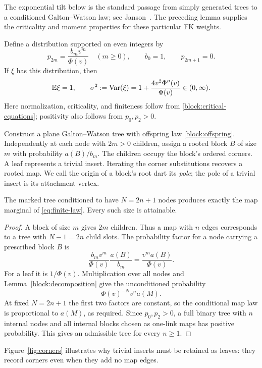 The exponential tilt below is the standard passage from simply
generated trees to a conditioned Galton--Watson law; see
Janson~\cite[Section~4]{Janson2012}. The preceding lemma supplies the
criticality and moment properties for these particular FK weights.

Define a distribution supported on even integers by
\begin{equation}\label{block:offspring}
 p_{2m}=\frac{b_mv^m}{\Phi(v)}\quad(m\ge0),\qquad
 b_0=1,\qquad p_{2m+1}=0.
\end{equation}
If $\xi$ has this distribution, then
\begin{equation}\label{block:moments}
 \mathbb E\xi=1,\qquad
 \sigma^2:=\operatorname{Var}(\xi)
     =1+\frac{4v^2\Phi''(v)}{\Phi(v)}\in(0,\infty).
\end{equation}
Here normalization, criticality, and finiteness follow from
\eqref{block:critical-equations}; positivity also follows from
$p_0,p_2>0$.

Construct a plane Galton--Watson tree with offspring law
\eqref{block:offspring}. Independently at each node with $2m>0$
children, assign a rooted block $B$ of size $m$ with probability
$a(B)/b_m$. The children occupy the block's ordered corners. A leaf
represents a trivial insert. Iterating the corner substitutions recovers
a rooted map. We call the origin of a block's root dart its \emph{pole};
the pole of a trivial insert is its attachment vertex.

\begin{proposition}\label{block:finite-law}
The marked tree conditioned to have $N=2n+1$ nodes produces exactly the
map marginal of \eqref{eq:finite-law}. Every such size is attainable.
\end{proposition}

\begin{proof}
A block of size $m$ gives $2m$ children. Thus a map with $n$ edges
corresponds to a tree with $N-1=2n$ child slots. The probability factor
for a node carrying a prescribed block $B$ is
\[
 \frac{b_mv^m}{\Phi(v)}\frac{a(B)}{b_m}
 =\frac{v^ma(B)}{\Phi(v)}.
\]
For a leaf it is $1/\Phi(v)$. Multiplication over all nodes and
Lemma~\ref{block:decomposition} give the unconditioned probability
\[
 \Phi(v)^{-N}v^na(M).
\]
At fixed $N=2n+1$ the first two factors are constant, so the conditional
map law is proportional to $a(M)$, as required.
Since $p_0,p_2>0$, a full binary tree with $n$ internal nodes and all
internal blocks chosen as one-link maps has positive probability.
This gives an admissible tree for every $n\ge1$.
\end{proof}

Figure~\ref{fig:corners} illustrates why trivial inserts must be retained
as leaves: they record corners even when they add no map edges.


